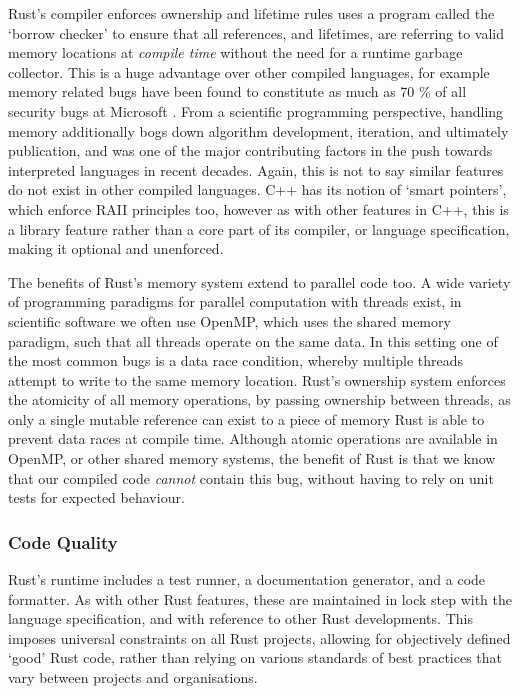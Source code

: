 
Rust's compiler enforces ownership and lifetime rules uses a program called the `borrow checker' to ensure that all references, and lifetimes, are referring to valid memory locations at \textit{compile time} without the need for a runtime garbage collector. This is a huge advantage over other compiled languages, for example memory related bugs have been found to constitute as much as 70 \% of all security bugs at Microsoft \cite{microsoft2019}. From a scientific programming perspective, handling memory additionally bogs down algorithm development, iteration, and ultimately publication, and was one of the major contributing factors in the push towards interpreted languages in recent decades. Again, this is not to say similar features do not exist in other compiled languages. C++ has its notion of `smart pointers', which enforce RAII principles too, however as with other features in C++, this is a library feature rather than a core part of its compiler, or language specification, making it optional and unenforced. 

The benefits of Rust's memory system extend to parallel code too. A wide variety of programming paradigms for parallel computation with threads exist, in scientific software we often use OpenMP, which uses the shared memory paradigm, such that all threads operate on the same data. In this setting one of the most common bugs is a data race condition, whereby multiple threads attempt to write to the same memory location. Rust's ownership system enforces the atomicity of all memory operations, by passing ownership between threads, as only a single mutable reference can exist to a piece of memory Rust is able to prevent data races at compile time. Although atomic operations are available in OpenMP, or other shared memory systems, the benefit of Rust is that we know that our compiled code \textit{cannot} contain this bug, without having to rely on unit tests for expected behaviour.

\subsubsection*{Code Quality}

Rust's runtime includes a test runner, a documentation generator, and a code formatter. As with other Rust features, these are maintained in lock step with the language specification, and with reference to other Rust developments. This imposes universal constraints on all Rust projects, allowing for objectively defined `good' Rust code, rather than relying on various standards of best practices that vary between projects and organisations.


